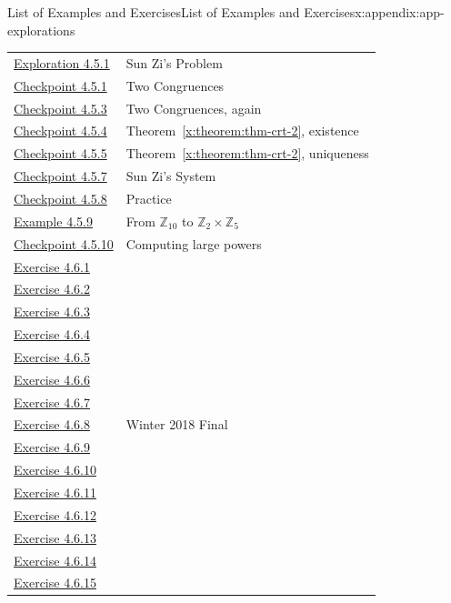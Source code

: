 \documentclass[oneside,10pt,]{book}
\newcommand{\xreffont}{\relax}
\numberwithin{equation}{section}
\begin{document}
\begin{appendixptx}{List of Examples and Exercises}{}{List of Examples and Exercises}{}{}{x:appendix:app-explorations}
\begin{longtable}[l]{ll}
\hyperref[x:exploration:expl-sunzi]{Exploration 4.5.1}& Sun Zi's Problem\\
\hyperref[x:exercise:ex-crt-small]{Checkpoint 4.5.1}& Two Congruences\\
\hyperref[x:exercise:ex-crt-small-again]{Checkpoint 4.5.3}& Two Congruences, again\\
\hyperref[x:exercise:ex-crt-2-prove-existence]{Checkpoint 4.5.4}& Theorem~{\xreffont\ref*{x:theorem:thm-crt-2}}, existence\\
\hyperref[x:exercise:ex-crt-2-prove-uniqueness]{Checkpoint 4.5.5}& Theorem~{\xreffont\ref*{x:theorem:thm-crt-2}}, uniqueness\\
\hyperref[x:exercise:ex-crt-sun-zi]{Checkpoint 4.5.7}& Sun Zi's System\\
\hyperref[x:exercise:ex-crt-n]{Checkpoint 4.5.8}& Practice\\
\hyperref[x:example:eg-crt-bijection]{Example 4.5.9}& From \(\mathbb{Z}_{10}\) to \(\mathbb{Z}_2 \times \mathbb{Z}_5\)\\
\hyperref[x:exercise:ex-crt-bijection-power]{Checkpoint 4.5.10}& Computing large powers\\
\hyperlink{g:exercise:id542503}{Exercise 4.6.1}& \\
\hyperlink{g:exercise:id542539}{Exercise 4.6.2}& \\
\hyperlink{g:exercise:id542573}{Exercise 4.6.3}& \\
\hyperlink{g:exercise:id542572}{Exercise 4.6.4}& \\
\hyperlink{g:exercise:id542599}{Exercise 4.6.5}& \\
\hyperlink{g:exercise:id542648}{Exercise 4.6.6}& \\
\hyperlink{g:exercise:id542674}{Exercise 4.6.7}& \\
\hyperlink{g:exercise:id542686}{Exercise 4.6.8}& Winter 2018 Final\\
\hyperlink{g:exercise:id542676}{Exercise 4.6.9}& \\
\hyperlink{g:exercise:id542747}{Exercise 4.6.10}& \\
\hyperlink{g:exercise:id542722}{Exercise 4.6.11}& \\
\hyperlink{g:exercise:id542776}{Exercise 4.6.12}& \\
\hyperlink{g:exercise:id542797}{Exercise 4.6.13}& \\
\hyperlink{x:exercise:ex-cong-power-two}{Exercise 4.6.14}& \\
\hyperlink{g:exercise:id542851}{Exercise 4.6.15}& \\

\end{longtable}
\end{appendixptx}
\end{document}
